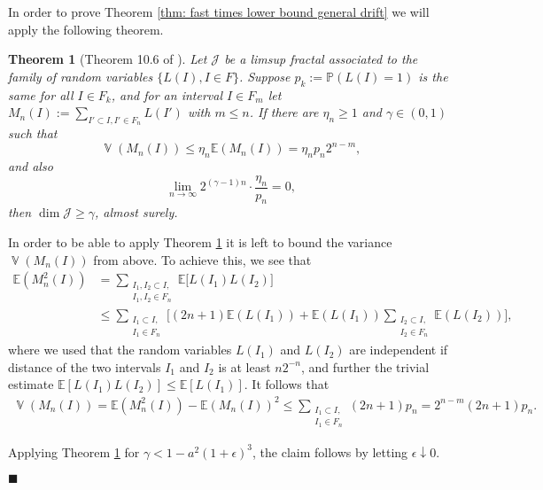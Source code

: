 \documentclass[11pt, reqno]{amsart}
\theoremstyle{plain}
\newtheorem{theorem}{Theorem}[section]
\theoremstyle{definition}
\theoremstyle{remark}
\begin{document}
In order to prove Theorem \ref{thm: fast times lower bound general drift} we will apply the following theorem.

\begin{theorem}[Theorem 10.6 of \cite{MP}]\label{thm: limsup fractal method}
Let ${\mathcal{J}}$ be a limsup fractal associated to the family of random variables $\{L(I), I\in F\}$. 
Suppose $p_k:={\mathbb{P}}(L(I) =1)$ is the same for all $I\in F_k$, and for an interval $I \in F_m$ let $M_n(I) := \sum_ {I'\subset I, I' \in F_n} L(I')$ with $m\leq n$. If there are $\eta_n \geq 1$ and $\gamma \in (0,1)$ such that
$$\operatorname{\mathbb{V}} (M_n(I)) \leq \eta_n {\mathbb{E}}(M_n(I)) = \eta_n p_n 2^{n-m},$$
and also
$$ \lim_{n\rightarrow\infty}  2^{(\gamma-1)n} \cdot \frac{\eta_n}{p_n} = 0,$$
then $\dim {\mathcal{J}} \geq \gamma$, almost surely.
\end{theorem}

In order to be able to apply Theorem \ref{thm: limsup fractal method} it is left to bound the variance $\operatorname{\mathbb{V}} (M_n(I))$ from above. To achieve this, we see that
\begin{align*}
{\mathbb{E}} (M^2_n(I)) &= \sum_{\substack{I_1, I_2\subset I,\\ I_1,I_2 \in F_n}} {\mathbb{E}} \big[ L(I_1)L(I_2) \big]\\
&\leq \sum_{\substack{I_1\subset I,\\ I_1 \in F_n}} \Big[ (2n+1){\mathbb{E}} ( L(I_1)) + {\mathbb{E}} ( L(I_1))\sum_{\substack{I_2\subset I,\\ I_2 \in F_n}}{\mathbb{E}} ( L(I_2)) \Big],
\end{align*}
where we used that the random variables $L(I_1)$ and $L(I_2)$ are independent if distance of the two intervals $I_1$ and $I_2$ is at least $n2^{-n}$, and further the trivial estimate ${\mathbb{E}}[L(I_1)L(I_2)]\leq {\mathbb{E}}[L(I_1)]$. It follows that
\begin{align*}
\operatorname{\mathbb{V}} (M_n(I)) = {\mathbb{E}} (M^2_n(I)) - {\mathbb{E}} (M_n(I))^2 \leq \sum_ {\substack{I_1\subset I,\\ I_1 \in F_n}} (2n+1)p_n = 2^{n-m}(2n+1)p_n.
\end{align*}

Applying Theorem \ref{thm: limsup fractal method} for $\gamma < 1 - a^2 (1 + \epsilon)^3$, the claim follows by letting $\epsilon \downarrow 0$.

\begin{flushright} $\blacksquare$ \end{flushright}
\end{document}

